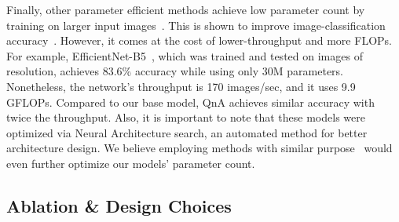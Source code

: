 Finally, other parameter efficient methods achieve low parameter count by training on larger input images~\cite{HaloNet, EfficientNet}. This is shown to improve image-classification accuracy~\cite{FixResNet}. However, it comes at the cost of lower-throughput and more FLOPs. For example, EfficientNet-B5~\cite{EfficientNet}, which was trained and tested on images of  resolution, achieves 83.6\% accuracy while using only 30M parameters. Nonetheless, the network's throughput is 170 images/sec, and it uses 9.9 GFLOPs. Compared to our base model, QnA achieves similar accuracy with twice the throughput. Also, it is important to note that these models were optimized via Neural Architecture search, an automated method for better architecture design. We believe employing methods with similar purpose~\cite{NViT} would even further optimize our models' parameter count.

\begin{table}
\centering
{}
\caption{\textbf{Multiple queries effect.} We compare the performance of SASA~\cite{SASA} to QnA with a varying amount of queries. As can be seen,  using multiple queries improves QnA, reaching comparable performance, using an order of magnitude less memory.}
\label{tbl:sasa_multiple_queries}
\end{table} 
\subsection{Ablation \& Design Choices}
\label{sec:ablation_and_design_choices}

